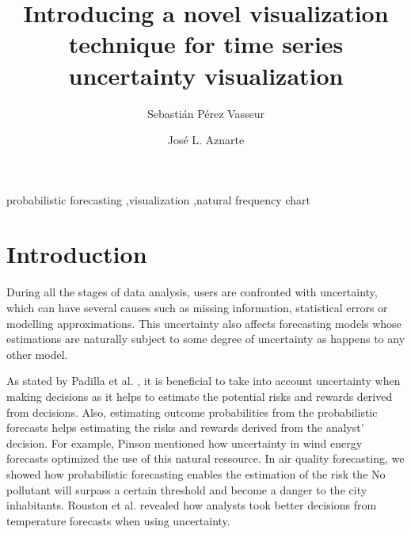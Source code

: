 \documentclass[a4paper,3p,sort&compress]{elsarticle}
\begin{document}
\linenumbers

\newcommand{\no}{NO\textsubscript{2}\xspace}

\begin{frontmatter}

  \title{Introducing a novel visualization technique for time series uncertainty visualization}


  \author{Sebasti\'an P\'erez Vasseur}
  \author{Jos\'e L. Aznarte}
  \address{Artificial Intelligence Department\\Universidad Nacional de
    Educaci\'on a Distancia --- UNED\\c/ Juan del Rosal, 16, Madrid, Spain}
  

\begin{abstract}
  
\end{abstract}

\begin{keyword}
probabilistic forecasting \sep visualization \sep natural frequency chart
\end{keyword}

\end{frontmatter}


\section{Introduction}
\label{sec:intro}

During all the stages of data analysis, users are confronted with uncertainty, which can have 
several causes such as missing information, statistical errors or modelling approximations.
This uncertainty also affects forecasting models whose estimations are naturally 
subject to some degree of uncertainty as happens to any other model. 

As stated by Padilla et al. \cite{padilla_uncertainty_2021}, it is beneficial to take into account uncertainty when making decisions as it
helps to estimate the potential risks and rewards derived from decisions. Also, 
estimating outcome probabilities from the probabilistic forecasts helps estimating the risks and rewards derived from the analyst'
decision. For example, Pinson mentioned how uncertainty 
in wind energy forecasts optimized the use of this natural ressource. In air quality forecasting, we showed 
how probabilistic forecasting enables the estimation of the risk the No pollutant will surpass a certain threshold 
and become a danger to the city inhabitants. Rouston et al. \cite{roulston_laboratory_2006} revealed how analysts 
took better decisions from temperature forecasts when using uncertainty.
\end{document}
